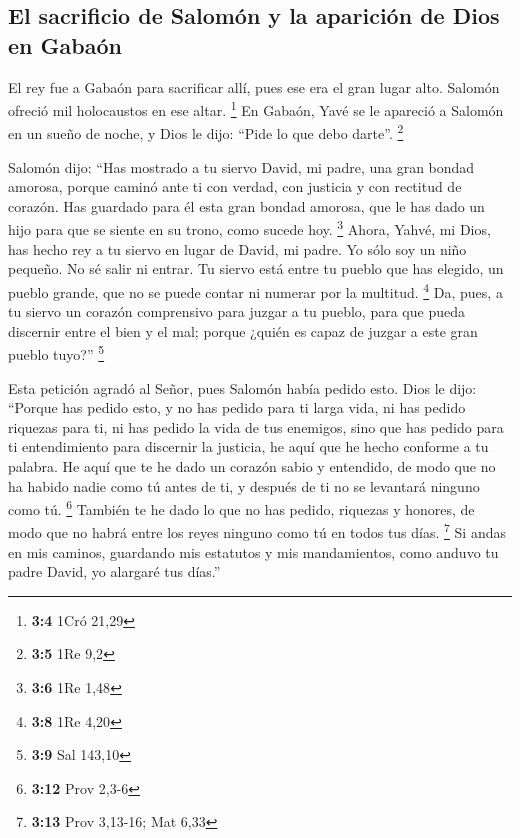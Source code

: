 \hypertarget{el-sacrificio-de-salomuxf3n-y-la-apariciuxf3n-de-dios-en-gabauxf3n}{%
\subsection{El sacrificio de Salomón y la aparición de Dios en
Gabaón}\label{el-sacrificio-de-salomuxf3n-y-la-apariciuxf3n-de-dios-en-gabauxf3n}}

 El rey fue a Gabaón para sacrificar allí, pues ese era el
gran lugar alto. Salomón ofreció mil holocaustos en ese altar.
\footnote{\textbf{3:4} 1Cró 21,29}  En Gabaón, Yavé se le
apareció a Salomón en un sueño de noche, y Dios le dijo: ``Pide lo que
debo darte''. \footnote{\textbf{3:5} 1Re 9,2}

 Salomón dijo: ``Has mostrado a tu siervo David, mi padre,
una gran bondad amorosa, porque caminó ante ti con verdad, con justicia
y con rectitud de corazón. Has guardado para él esta gran bondad
amorosa, que le has dado un hijo para que se siente en su trono, como
sucede hoy. \footnote{\textbf{3:6} 1Re 1,48}  Ahora,
Yahvé, mi Dios, has hecho rey a tu siervo en lugar de David, mi padre.
Yo sólo soy un niño pequeño. No sé salir ni entrar.  Tu
siervo está entre tu pueblo que has elegido, un pueblo grande, que no se
puede contar ni numerar por la multitud. \footnote{\textbf{3:8} 1Re 4,20}
 Da, pues, a tu siervo un corazón comprensivo para juzgar
a tu pueblo, para que pueda discernir entre el bien y el mal; porque
¿quién es capaz de juzgar a este gran pueblo tuyo?'' \footnote{\textbf{3:9}
  Sal 143,10}

 Esta petición agradó al Señor, pues Salomón había pedido
esto.  Dios le dijo: ``Porque has pedido esto, y no has
pedido para ti larga vida, ni has pedido riquezas para ti, ni has pedido
la vida de tus enemigos, sino que has pedido para ti entendimiento para
discernir la justicia,  he aquí que he hecho conforme a
tu palabra. He aquí que te he dado un corazón sabio y entendido, de modo
que no ha habido nadie como tú antes de ti, y después de ti no se
levantará ninguno como tú. \footnote{\textbf{3:12} Prov 2,3-6}
 También te he dado lo que no has pedido, riquezas y
honores, de modo que no habrá entre los reyes ninguno como tú en todos
tus días. \footnote{\textbf{3:13} Prov 3,13-16; Mat 6,33}
 Si andas en mis caminos, guardando mis estatutos y mis
mandamientos, como anduvo tu padre David, yo alargaré tus días.''

